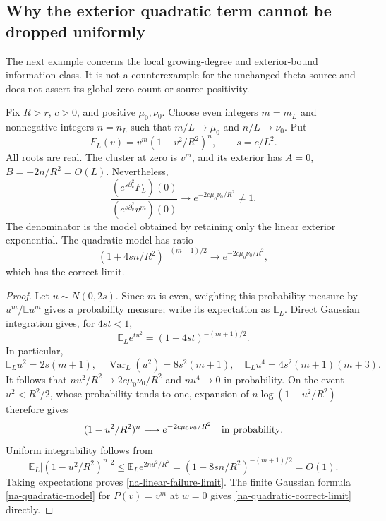 \subsection{Why the exterior quadratic term cannot be dropped uniformly}
\label{na-curvature-subsection}

The next example concerns the local growing-degree and exterior-bound
information class. It is not a counterexample for the unchanged theta
source and does not assert its global zero count or source positivity.

\begin{proposition}
\label{na-linear-omission}
Fix $R>r$, $c>0$, and positive $\mu_0,\nu_0$. Choose even integers
$m=m_L$ and nonnegative integers $n=n_L$ such that
$m/L\to\mu_0$ and $n/L\to\nu_0$. Put
\[
 F_L(v)=v^m(1-v^2/R^2)^n,\qquad s=c/L^2.
\]
All roots are real. The cluster at zero is $v^m$, and its exterior
has $A=0$, $B=-2n/R^2=O(L)$. Nevertheless,
\begin{equation}
 \frac{(e^{s\partial_v^2}F_L)(0)}
      {(e^{s\partial_v^2}v^m)(0)}
       \longrightarrow e^{-2c\mu_0\nu_0/R^2}\ne1.
 \label{na-linear-failure-limit}
\end{equation}
The denominator is the model obtained by retaining only the linear
exterior exponential. The quadratic model has ratio
\begin{equation}
 (1+4sn/R^2)^{-(m+1)/2}
       \longrightarrow e^{-2c\mu_0\nu_0/R^2},
 \label{na-quadratic-correct-limit}
\end{equation}
which has the correct limit.
\end{proposition}
\begin{proof}
Let $u\sim N(0,2s)$. Since $m$ is even, weighting this probability
measure by $u^m/\mathbb E u^m$ gives a probability measure;
write its expectation as $\mathbb E_L$. Direct Gaussian integration
gives, for $4st<1$,
\[
 \mathbb E_L e^{tu^2}=(1-4st)^{-(m+1)/2}.
\]
In particular,
\[
 \mathbb E_Lu^2=2s(m+1),\quad
 \operatorname{Var}_L(u^2)=8s^2(m+1),\quad
 \mathbb E_Lu^4=4s^2(m+1)(m+3).
\]
It follows that $nu^2/R^2\to2c\mu_0\nu_0/R^2$ and
$nu^4\to0$ in probability. On the event $u^2<R^2/2$, whose
probability tends to one, expansion of $n\log(1-u^2/R^2)$
therefore gives
\[
 (1-u^2/R^2)^n\longrightarrow
               e^{-2c\mu_0\nu_0/R^2}
 \quad\hbox{in probability}.
\]
Uniform integrability follows from
\[
 \mathbb E_L\bigl|(1-u^2/R^2)^n\bigr|^2
 \le\mathbb E_L e^{2nu^2/R^2}
 =(1-8sn/R^2)^{-(m+1)/2}=O(1).
\]
Taking expectations proves \eqref{na-linear-failure-limit}.
The finite Gaussian formula \eqref{na-quadratic-model} for $P(v)=v^m$
at $w=0$ gives \eqref{na-quadratic-correct-limit} directly.
\end{proof}

